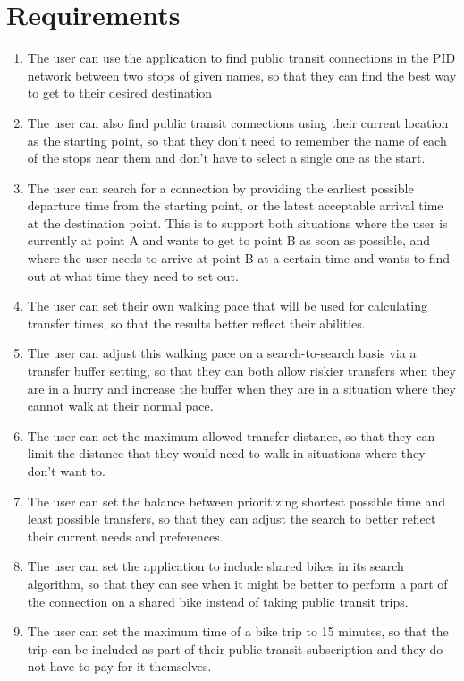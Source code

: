 \newpage

\section{Requirements}

\begin{enumerate}
\renewcommand{\labelenumi}{\textbf{R\arabic{enumi}}}
\item The user can use the application to find public transit connections in the PID network between two stops of given names, so that they can find the best way to get to their desired destination
\item The user can also find public transit connections using their current location as the starting point, so that they don't need to remember the name of each of the stops near them and don't have to select a single one as the start.
\item The user can search for a connection by providing the earliest possible departure time from the starting point, or the latest acceptable arrival time at the destination point. This is to support both situations where the user is currently at point A and wants to get to point B as soon as possible, and where the user needs to arrive at point B at a certain time and wants to find out at what time they need to set out.
\item The user can set their own walking pace that will be used for calculating transfer times, so that the results better reflect their abilities.
\item The user can adjust this walking pace on a search-to-search basis via a transfer buffer setting, so that they can both allow riskier transfers when they are in a hurry and increase the buffer when they are in a situation where they cannot walk at their normal pace.
\item The user can set the maximum allowed transfer distance, so that they can limit the distance that they would need to walk in situations where they don't want to.
\item The user can set the balance between prioritizing shortest possible time and least possible transfers, so that they can adjust the search to better reflect their current needs and preferences.
\item The user can set the application to include shared bikes in its search algorithm, so that they can see when it might be better to perform a part of the connection on a shared bike instead of taking public transit trips.
\item The user can set the maximum time of a bike trip to 15 minutes, so that the trip can be included as part of their public transit subscription and they do not have to pay for it themselves.

\end{enumerate}
